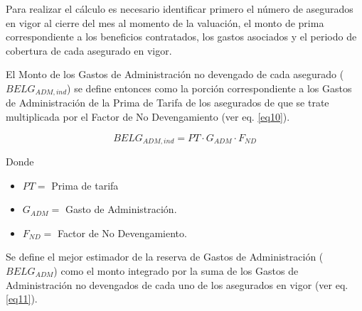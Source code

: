 \documentclass[11pt,twoside,openright,spanish]{report}
\numberwithin{equation}{chapter}
\numberwithin{figure}{chapter}
\numberwithin{table}{chapter}
\begin{document}
Para realizar el cálculo es necesario identificar primero el número de asegurados en vigor al cierre del mes al momento de la valuación, el monto de prima correspondiente a los beneficios contratados, los gastos asociados y el periodo de cobertura de cada asegurado en vigor.



El  Monto de los Gastos de Administración no devengado de cada asegurado ($BELG_{ADM,ind}$) se define entonces como la porción correspondiente a los Gastos de Administración de la Prima de Tarifa de los asegurados de que se trate multiplicada por el Factor de No Devengamiento (ver eq. \ref{eq10}). 

\begin{equation}
	BELG_{ADM,ind}=	PT \cdot G_{ADM} \cdot F_{ND}
	\label{eq10}
\end{equation}



Donde

\begin{itemize}
	\setlength\itemsep{-0.5em}
	\item $PT=$ Prima de tarifa
	
	\item $G_{ADM}^{}=$ Gasto de Administración.
	
	\item $F_{ND}^{}=$ Factor de No Devengamiento.
\end{itemize}

Se define el mejor estimador de la reserva de Gastos de Administración ($BELG_{ADM}$) como el monto integrado por la suma de los Gastos de Administración no devengados de cada uno de los asegurados en vigor (ver eq. \ref{eq11}).
\end{document}

